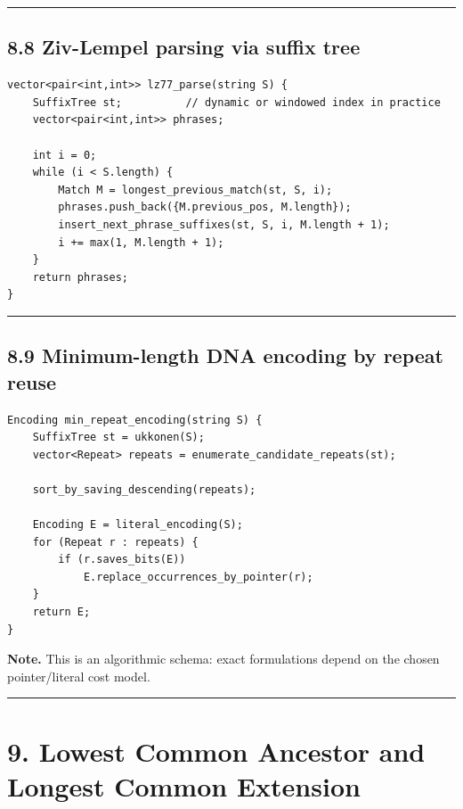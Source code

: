 \documentclass[11pt]{article}
\begin{document}
\begin{center}\rule{0.5\linewidth}{0.5pt}\end{center}

\subsection{8.8 Ziv-Lempel parsing via suffix tree}\label{ziv-lempel-parsing-via-suffix-tree}

\begin{verbatim}
vector<pair<int,int>> lz77_parse(string S) {
    SuffixTree st;          // dynamic or windowed index in practice
    vector<pair<int,int>> phrases;

    int i = 0;
    while (i < S.length) {
        Match M = longest_previous_match(st, S, i);
        phrases.push_back({M.previous_pos, M.length});
        insert_next_phrase_suffixes(st, S, i, M.length + 1);
        i += max(1, M.length + 1);
    }
    return phrases;
}
\end{verbatim}

\begin{center}\rule{0.5\linewidth}{0.5pt}\end{center}

\subsection{8.9 Minimum-length DNA encoding by repeat reuse}\label{minimum-length-dna-encoding-by-repeat-reuse}

\begin{verbatim}
Encoding min_repeat_encoding(string S) {
    SuffixTree st = ukkonen(S);
    vector<Repeat> repeats = enumerate_candidate_repeats(st);

    sort_by_saving_descending(repeats);

    Encoding E = literal_encoding(S);
    for (Repeat r : repeats) {
        if (r.saves_bits(E))
            E.replace_occurrences_by_pointer(r);
    }
    return E;
}
\end{verbatim}

\textbf{Note.} This is an algorithmic schema: exact formulations depend on the chosen pointer/literal cost model.

\begin{center}\rule{0.5\linewidth}{0.5pt}\end{center}

\section{9. Lowest Common Ancestor and Longest Common Extension}\label{lowest-common-ancestor-and-longest-common-extension}
\end{document}
